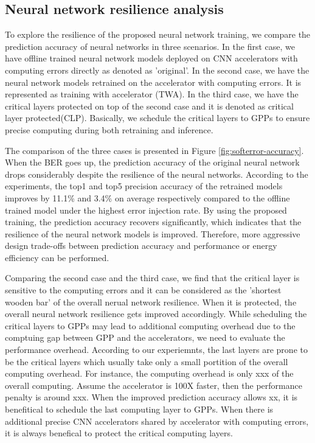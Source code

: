\subsection{Neural network resilience analysis}
To explore the resilience of the proposed neural network training, we
compare the prediction accuracy of neural networks in three scenarios.
In the first case, we have offline trained neural network models deployed on 
CNN accelerators with computing errors directly as denoted as 'original'.
In the second case, we have the neural network models retrained on the 
accelerator with computing errors. It is represented as training with 
accelerator (TWA). In the third case, we have the critical layers 
protected on top of the second case and it is denoted as critical layer protected(CLP). 
Basically, we schedule the critical layers to 
GPPs to ensure precise computing during both retraining and inference.

The comparison of the three cases is presented in Figure \ref{fig:softerror-accuracy}.
When the BER goes up, the prediction accuracy of the original neural network drops 
considerably despite the resilience of the neural networks. 
According to the experiments, the top1 and top5 precision accuracy of the retrained models 
improves by 11.1\% and 3.4\% on average respectively compared to the offline trained 
model under the highest error injection rate. By using the proposed training, 
the prediction accuracy recovers significantly, which indicates that the resilience 
of the neural network models is improved. Therefore, more aggressive design trade-offs 
between prediction accuracy and performance or energy efficiency can be performed. 

Comparing the second case and the third case, we find that the critical layer 
is sensitive to the computing errors and it can be considered as the 'shortest 
wooden bar' of the overall nerual network resilience. When it is protected, 
the overall neural network resilience gets improved accordingly.
While scheduling the critical layers to GPPs may lead to additional computing overhead 
due to the comptuing gap between GPP and the accelerators, we need to evaluate the 
performance overhead. According to our experiemnts, the last layers are prone to 
be the critical layers which usually take only a small portition of the overall 
computing overhead. For instance, the computing overhead is only xxx of the overall computing.
Assume the accelerator is 100X faster, then the performance penalty is around xxx.
When the improved prediction accuracy allows xx, it is benefitical to schedule the 
last computing layer to GPPs. When there is additional precise CNN accelerators shared by 
accelerator with computing errors, it is always benefical to protect the critical computing layers.

